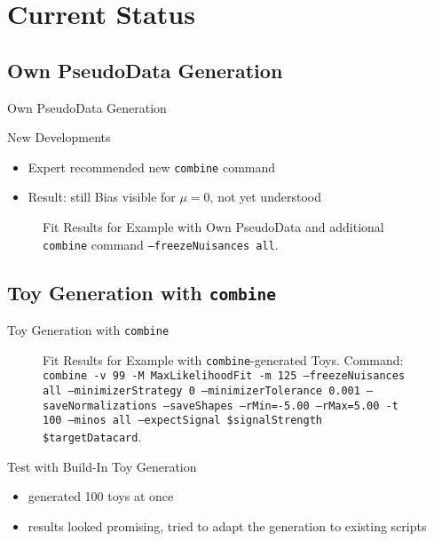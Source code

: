 \section{Current Status}
\subsection{Own PseudoData Generation}
\begin{frame}{Own PseudoData Generation}
\begin{block}{New Developments}
\begin{itemize}
\item Expert recommended new \texttt{combine} command
\item Result: still Bias visible for $\mu = 0$, not yet understood
\end{itemize}
\end{block}

\vskip -0.6cm
\begin{figure}
\centering
{}
\caption[Fit Results for Example with Own PseudoData and additional \texttt{combine} command]{Fit Results for Example with Own PseudoData and additional \texttt{combine} command \texttt{--freezeNuisances all}.}
\end{figure}

\end{frame}
\subsection{Toy Generation with \texttt{combine}}
\begin{frame}{Toy Generation with \texttt{combine}}
\vskip -0.7cm
\begin{figure}
\centering
{}
\caption[Fit Results for Example with \texttt{combine}-generated Toys]{Fit Results for Example with \texttt{combine}-generated Toys. Command: \texttt{combine -v 99 -M MaxLikelihoodFit -m 125 --freezeNuisances all --minimizerStrategy 0 --minimizerTolerance 0.001 --saveNormalizations --saveShapes --rMin=-5.00 --rMax=5.00 -t 100 --minos all --expectSignal \$signalStrength \$targetDatacard}.}
\end{figure}
\vskip -0.6cm
\begin{block}{Test with Build-In Toy Generation}
\begin{itemize}
\item generated 100 toys at once
\item results looked promising, tried to adapt the generation to existing scripts
\end{itemize}
\end{block}

\end{frame}

